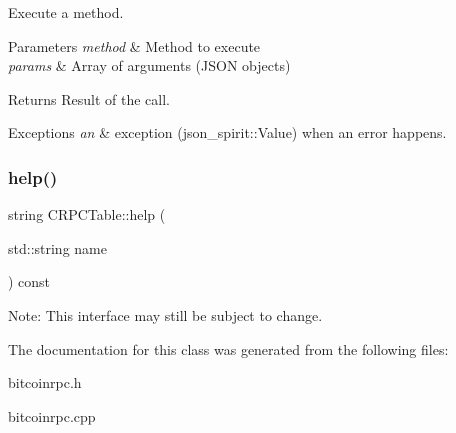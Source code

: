 Execute a method. 
\begin{DoxyParams}{Parameters}
{\em method} & Method to execute \\
\hline
{\em params} & Array of arguments (J\+S\+ON objects) \\
\hline
\end{DoxyParams}
\begin{DoxyReturn}{Returns}
Result of the call. 
\end{DoxyReturn}

\begin{DoxyExceptions}{Exceptions}
{\em an} & exception (json\+\_\+spirit\+::\+Value) when an error happens. \\
\hline
\end{DoxyExceptions}
\mbox{\label{class_c_r_p_c_table_aaba3a5908a430d07084292d5a894c812}} 
\subsubsection{\texorpdfstring{help()}{help()}}
{\footnotesize\ttfamily string C\+R\+P\+C\+Table\+::help (\begin{DoxyParamCaption}\item[{std\+::string}]{name }\end{DoxyParamCaption}) const}

Note\+: This interface may still be subject to change. 

The documentation for this class was generated from the following files\+:\begin{DoxyCompactItemize}
\item 
bitcoinrpc.\+h\item 
bitcoinrpc.\+cpp\end{DoxyCompactItemize}
